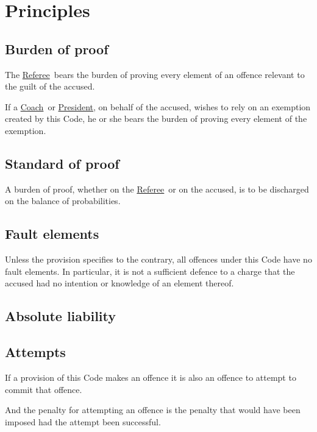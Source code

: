 \documentclass[12pt]{report}
\makeatletter
\newcommand{\nop}[1]{\Hy@raisedlink{\hypertarget{#1}{}}}
\newcommand{\hyplink}[1]{\hyperlink{#1}{{#1}}}
\newcommand{\defi}[1]{\nop{#1}{\textbf{\emph{#1}}}\index{#1}}
\newcommand{\Captain}{\hyplink{Coach}}
\newcommand\President{\hyplink{President}}\newcommand\xPresident{President}
\newcommand{\Referee}{\hyplink{Referee}}
\makeatother
\begin{document}
  \chapter{Principles}
  \section{Burden of proof}
  \begin{fenumerate}\item
  The \Referee\ bears the burden of proving every element of an offence relevant to the guilt of the accused.
  \item If a \Captain\ or \President, on behalf of the accused, wishes to rely on an exemption created by this Code, he or she bears the burden of proving every element of the exemption.
  \end{fenumerate}
  \section{Standard of proof}
    \begin{fenumerate}\item
  A burden of proof, whether on the \Referee\ or on the accused, is to be discharged on the balance of probabilities.\end{fenumerate}
  \section{Fault elements}
    \begin{fenumerate}\item
  Unless the provision specifies to the contrary,  all offences under this Code have no fault elements. In particular, it is not a sufficient defence to a charge that the accused had no intention or knowledge of an element thereof.
  \end{fenumerate}
  \section{Absolute liability}%
  \section{Attempts}
  \begin{fenumerate}
    \item If a provision of this Code makes an offence it is also an offence to attempt to commit that offence.

    And the penalty for attempting an offence is the penalty that would have been imposed had the attempt been successful.
  \end{fenumerate}
\end{document}
